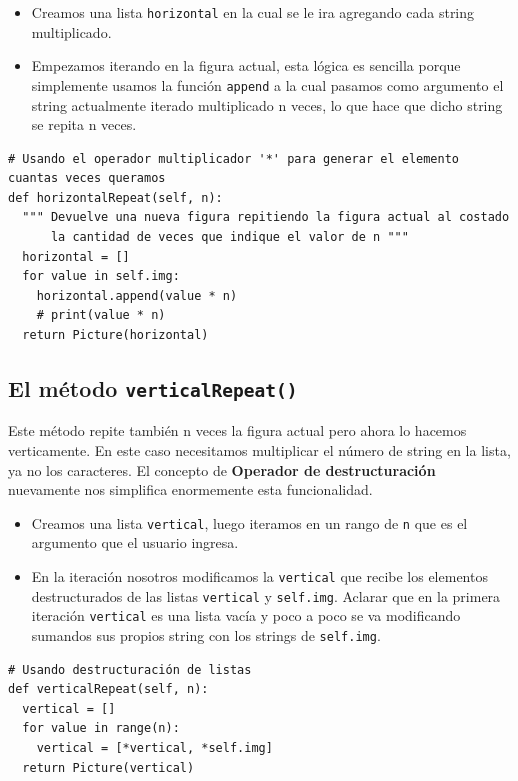 \documentclass[10pt, a4paper]{article}
\newcommand{\mintpython}[1]{\texttt{#1}}
\begin{document}
\begin{itemize}
  \item Creamos una lista \mintpython{horizontal} en la cual se le ira agregando cada string multiplicado.
  \item Empezamos iterando en la figura actual, esta lógica es sencilla porque simplemente usamos la función \mintpython{append} a la cual pasamos como argumento el string actualmente iterado multiplicado n veces, lo que hace que dicho string se repita n veces.
\end{itemize}

\begin{verbatim}
# Usando el operador multiplicador '*' para generar el elemento cuantas veces queramos
def horizontalRepeat(self, n):
  """ Devuelve una nueva figura repitiendo la figura actual al costado
      la cantidad de veces que indique el valor de n """
  horizontal = []
  for value in self.img:
    horizontal.append(value * n)
    # print(value * n)
  return Picture(horizontal)
\end{verbatim}

\subsection{El método \mintpython{verticalRepeat()}}
Este método repite también n veces la figura actual pero ahora lo hacemos verticamente. En este caso necesitamos multiplicar el número de string en la lista, ya no los caracteres. El concepto de \textbf{Operador de destructuración} nuevamente nos simplifica enormemente esta funcionalidad.

\begin{itemize}
  \item Creamos una lista \mintpython{vertical}, luego iteramos en un rango de \mintpython{n} que es el argumento que el usuario ingresa. 
  \item En la iteración nosotros modificamos la \mintpython{vertical} que recibe los elementos destructurados de las listas \mintpython{vertical} y \mintpython{self.img}. Aclarar que en la primera iteración \mintpython{vertical} es una lista vacía y poco a poco se va modificando sumandos sus propios string con los strings de \mintpython{self.img}.
\end{itemize}

\begin{verbatim}
# Usando destructuración de listas
def verticalRepeat(self, n):
  vertical = []
  for value in range(n):
    vertical = [*vertical, *self.img]
  return Picture(vertical)
\end{verbatim}
\end{document}
